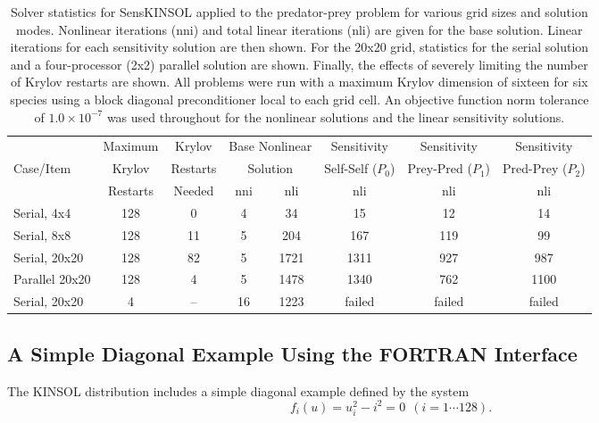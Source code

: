 \documentclass[11pt]{article}
\begin{document}
\begin{table}
\center
\small
\caption{Solver statistics for SensKINSOL applied to the predator-prey problem
for various grid sizes and solution modes. Nonlinear iterations (nni) and total
linear iterations (nli) are given for the base solution. Linear iterations for
each sensitivity solution are then shown. For the 20x20 grid, statistics for
the serial solution and a four-processor (2x2) parallel solution are shown.
Finally, the effects of severely limiting the number of Krylov restarts are
shown. All problems were run with a maximum Krylov dimension of sixteen for
six species using a block diagonal preconditioner local to each grid cell.
An objective function norm tolerance of $1.0\times10^{-7}$ was used throughout for
the nonlinear solutions and the linear sensitivity solutions.}
\vspace{6 pt}
\label{predprey_stat}
\footnotesize
\renewcommand{\arraystretch}{1.35}
\begin{tabular}{|l|c|c|c|c|c|c|c|}
\hline
          & Maximum   & Krylov   & \multicolumn{2}{|c|}{Base Nonlinear} & Sensitivity    & Sensitivity    & 
Sensitivity \\
Case/Item & Krylov    & Restarts & \multicolumn{2}{|c|}{Solution} & Self-Self ($P_0$) & 
Prey-Pred ($P_1$) & Pred-Prey ($P_2$) \\
\cline{4-8}
          & Restarts  & Needed   & nni & nli & nli & nli & nli \\
\hline \hline
Serial, 4x4    & 128 &  0 &  4 &   34 &     15 &     12 &     14 \\
\hline
Serial, 8x8    & 128 & 11 &  5 &  204 &    167 &    119 &     99 \\
\hline
Serial, 20x20  & 128 & 82 &  5 & 1721 &   1311 &    927 &    987 \\
\hline
Parallel 20x20 & 128 &  4 &  5 & 1478 &   1340 &    762 &   1100 \\
\hline
Serial, 20x20  &   4 & -- & 16 & 1223 & failed & failed & failed \\
\hline
\end{tabular}
\end{table}

\subsection{A Simple Diagonal Example Using the FORTRAN Interface}

The KINSOL distribution includes a simple diagonal example defined by
the system
\begin{equation}
f_i(u) = u_i^2 -  i^2 = 0 ~~ (i = 1 \cdots 128) .
\end{equation}
\end{document}
